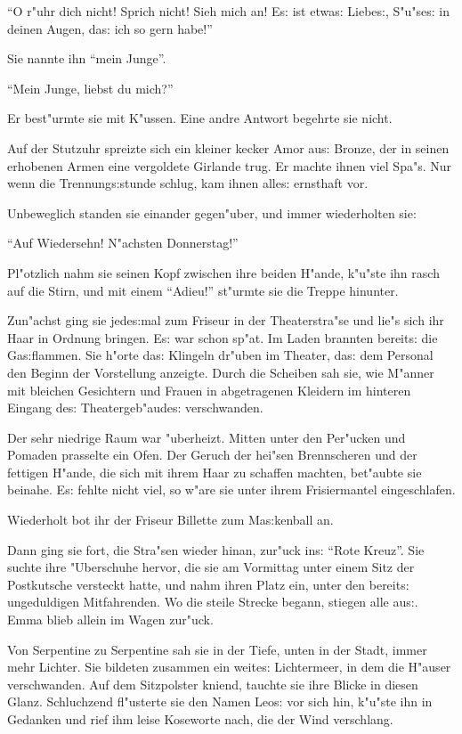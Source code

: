 \documentclass[oneside,12pt]{book}
\newcommand{\s}{s:}%
\begin{document}
"`O r"uhr dich nicht! Sprich nicht! Sieh mich an! E{\s} ist
etwa{\s} Liebe{\s}, S"u"se{\s} in deinen Augen, da{\s} ich so gern
habe!"'

Sie nannte ihn "`mein Junge"'.

"`Mein Junge, liebst du mich?"'

Er best"urmte sie mit K"ussen. Eine andre Antwort begehrte sie
nicht.

Auf der Stutzuhr spreizte sich ein kleiner kecker Amor au{\s}
Bronze, der in seinen erhobenen Armen eine vergoldete Girlande
trug. Er machte ihnen viel Spa"s. Nur wenn die Trennung{\s}stunde
schlug, kam ihnen alle{\s} ernsthaft vor.

Unbeweglich standen sie einander gegen"uber, und immer
wiederholten sie:

"`Auf Wiedersehn! N"achsten Donnerstag!"'

Pl"otzlich nahm sie seinen Kopf zwischen ihre beiden H"ande,
k"u"ste ihn rasch auf die Stirn, und mit einem "`Adieu!"' st"urmte
sie die Treppe hinunter.

Zun"achst ging sie jede{\s}mal zum Friseur in der Theaterstra"se
und lie"s sich ihr Haar in Ordnung bringen. E{\s} war schon sp"at.
Im Laden brannten bereit{\s} die Ga{\s}flammen. Sie h"orte da{\s}
Klingeln dr"uben im Theater, da{\s} dem Personal den Beginn der
Vorstellung anzeigte. Durch die Scheiben sah sie, wie M"anner mit
bleichen Gesichtern und Frauen in abgetragenen Kleidern im
hinteren Eingang de{\s} Theatergeb"aude{\s} verschwanden.

Der sehr niedrige Raum war "uberheizt. Mitten unter den Per"ucken
und Pomaden prasselte ein Ofen. Der Geruch der hei"sen
Brennscheren und der fettigen H"ande, die sich mit ihrem Haar zu
schaffen machten, bet"aubte sie beinahe. E{\s} fehlte nicht viel,
so w"are sie unter ihrem Frisiermantel eingeschlafen.

Wiederholt bot ihr der Friseur Billette zum Ma{\s}kenball an.

Dann ging sie fort, die Stra"sen wieder hinan, zur"uck in{\s}
"`Rote Kreuz"'. Sie suchte ihre "Uberschuhe hervor, die sie am
Vormittag unter einem Sitz der Postkutsche versteckt hatte, und
nahm ihren Platz ein, unter den bereit{\s} ungeduldigen
Mitfahrenden. Wo die steile Strecke begann, stiegen alle au{\s}.
Emma blieb allein im Wagen zur"uck.

Von Serpentine zu Serpentine sah sie in der Tiefe, unten in der
Stadt, immer mehr Lichter. Sie bildeten zusammen ein weite{\s}
Lichtermeer, in dem die H"auser verschwanden. Auf dem Sitzpolster
kniend, tauchte sie ihre Blicke in diesen Glanz. Schluchzend
fl"usterte sie den Namen Leo{\s} vor sich hin, k"u"ste ihn in
Gedanken und rief ihm leise Koseworte nach, die der Wind
verschlang.
\end{document}
